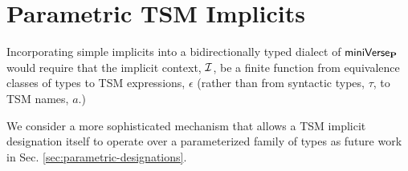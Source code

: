 
\endgroup

\section{Parametric TSM Implicits}\label{sec:parametric-simple-implicits}
Incorporating simple implicits into a bidirectionally typed dialect of $\mathsf{miniVerse}_\textbf{P}$ would require that the implicit context, $\mathcal{I}$, be a finite function from {equivalence classes} of types to TSM expressions, $\epsilon$ (rather than from syntactic types, $\tau$, to TSM names, $a$.)

We consider a more sophisticated mechanism that allows a TSM implicit designation itself  to operate over a parameterized family of types as future work in Sec. \ref{sec:parametric-designations}. 

